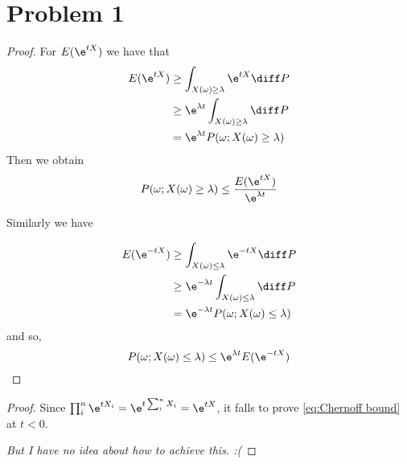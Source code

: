     \section{Problem 1}
    \begin{subproblem}
        \item
        \begin{proof}
            For $E(\e^{tX})$ we have that
            \begin{align*}
                E(\e^{tX})&\geq\int_{X(\omega)\geq\lambda}\e^{tX}\diff P\\
                &\geq\e^{\lambda t}\int_{X(\omega)\geq\lambda}\diff P\\
                &=\e^{\lambda t}P(\omega;X(\omega)\geq\lambda)
            \end{align*}
            Then we obtain
            \begin{equation}
                \label{eq:Chernoff bound}
                P(\omega;X(\omega)\geq\lambda)\leq\frac{E(\e^{tX})}{\e^{\lambda t}}
            \end{equation}

            Similarly we have

            \begin{align*}
                E(\e^{-tX})&\geq\int_{X(\omega)\leq\lambda}\e^{-tX}\diff P\\
                &\geq\e^{-\lambda t}\int_{X(\omega)\leq\lambda}\diff P\\
                &=\e^{-\lambda t}P(\omega;X(\omega)\leq\lambda)
            \end{align*}
            and so,
            \[P(\omega;X(\omega)\leq\lambda)\leq\e^{\lambda t}E(\e^{-tX})\]
        \end{proof}

        \item
        \begin{proof}
            Since $\prod_i^n\e^{tX_i}=\e^{t\sum_i^n X_i}=\e^{tX}$,
            it falls to prove \cref{eq:Chernoff bound} at $t<0$.

            \emph{But I have no idea about how to achieve this. :(}
        \end{proof}
    \end{subproblem}

